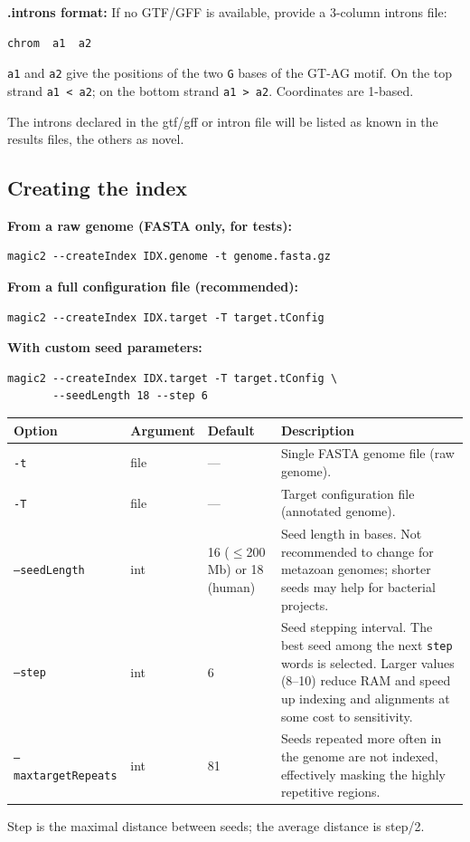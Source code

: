 \documentclass[11pt]{article}
\newcommand{\code}[1]{\texttt{#1}}
\begin{document}
\textbf{.introns format:} If no GTF/GFF is available, provide a
3-column introns file:
\begin{lstlisting}
chrom  a1  a2
\end{lstlisting}
\code{a1} and \code{a2} give the positions of the two \texttt{G} bases
of the GT-AG motif.  On the top strand \code{a1 < a2}; on the bottom
strand \code{a1 > a2}. Coordinates are 1-based.

The introns declared in the gtf/gff or intron file will be listed as known
in the results files, the others as novel.

\subsection{Creating the index}

\textbf{From a raw genome (FASTA only, for tests):}
\begin{lstlisting}
magic2 --createIndex IDX.genome -t genome.fasta.gz
\end{lstlisting}

\textbf{From a full configuration file (recommended):}
\begin{lstlisting}
magic2 --createIndex IDX.target -T target.tConfig
\end{lstlisting}

\textbf{With custom seed parameters:}
\begin{lstlisting}
magic2 --createIndex IDX.target -T target.tConfig \
       --seedLength 18 --step 6
\end{lstlisting}

\begin{center}
\begin{tabular}{lll p{6.5cm}}
\toprule
\textbf{Option} & \textbf{Argument} & \textbf{Default} & \textbf{Description} \\
\midrule
\code{-t}            & file & ---  & Single FASTA genome file (raw genome). \\
\code{-T}            & file & ---  & Target configuration file (annotated genome). \\
\code{--seedLength}  & int  & 16 (\(\leq\)200 Mb) or 18 (human)
                     & Seed length in bases.  Not recommended to change for
                       metazoan genomes; shorter seeds may help for
                       bacterial projects. \\
\code{--step}        & int  & 6
                     & Seed stepping interval.  The best seed among the next
                       \code{step} words is selected.  Larger values (8--10)
                       reduce RAM and speed up indexing and alignments
                       at some cost to sensitivity. \\
                       \code{--maxtargetRepeats}  &int & 81 & Seeds repeated
                       more often in the genome are not indexed,
                       effectively masking the highly repetitive regions.\\                        
\bottomrule
\end{tabular}
\end{center}
Step is the maximal distance between seeds; the average distance is step/2.
\end{document}

